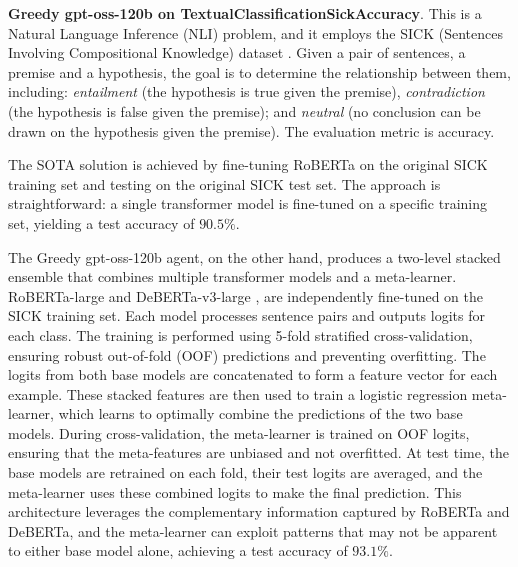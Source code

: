 \documentclass{fairmeta}
\begin{document}



\textbf{Greedy gpt-oss-120b on TextualClassificationSickAccuracy}. This is a Natural Language Inference (NLI) problem, and it employs the SICK (Sentences Involving Compositional Knowledge) dataset \citep{marelli2014semeval}. Given a pair of sentences, a premise and a hypothesis, the goal is to determine the relationship between them, including: \textit{entailment} (the hypothesis is true given the premise), \textit{contradiction} (the hypothesis is false given the premise); and \textit{neutral} (no conclusion can be drawn on the hypothesis given the premise). The evaluation metric is accuracy.

The SOTA solution \citep{kalouli2023curing} is achieved by fine-tuning RoBERTa \citep{liu2019roberta} on the original SICK training set and testing on the original SICK test set. The approach is straightforward: a single transformer model is fine-tuned on a specific training set, yielding a test accuracy of $90.5\%$.

The Greedy gpt-oss-120b agent, on the other hand, produces a two-level stacked ensemble that combines multiple transformer models and a meta-learner. RoBERTa-large and DeBERTa-v3-large \citep{he2023debertav3}, are independently fine-tuned on the SICK training set. Each model processes sentence pairs and outputs logits for each class. The training is performed using 5-fold stratified cross-validation, ensuring robust out-of-fold (OOF) predictions and preventing overfitting. The logits from both base models are concatenated to form a feature vector for each example. These stacked features are then used to train a logistic regression meta-learner, which learns to optimally combine the predictions of the two base models. During cross-validation, the meta-learner is trained on OOF logits, ensuring that the meta-features are unbiased and not overfitted. At test time, the base models are retrained on each fold, their test logits are averaged, and the meta-learner uses these combined logits to make the final prediction. This architecture leverages the complementary information captured by RoBERTa and DeBERTa, and the meta-learner can exploit patterns that may not be apparent to either base model alone, achieving a test accuracy of $93.1\%$.
\end{document}
